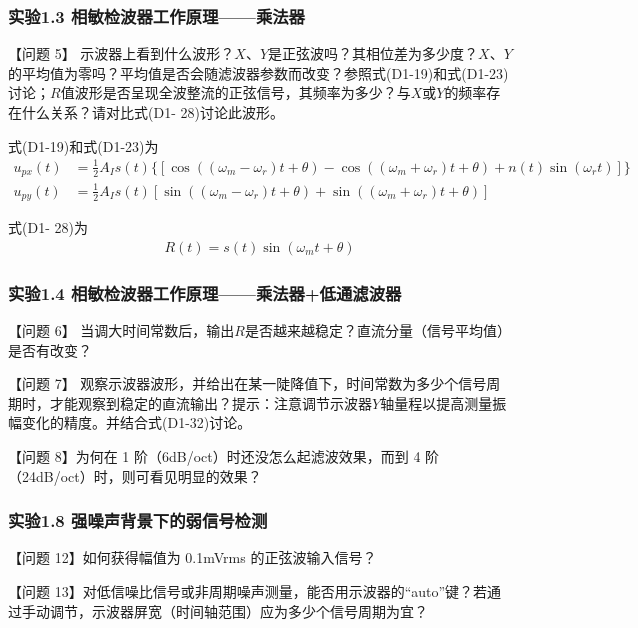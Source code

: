 \documentclass[dvipsnames, svgnames,a4paper,11pt]{article}
\begin{document}
	\subsubsection*{实验1.3 \quad 相敏检波器工作原理——乘法器}

		【问题 5】 示波器上看到什么波形？$X$、$Y$是正弦波吗？其相位差为多少度？$X$、$Y$的平均值为零吗？平均值是否会随滤波器参数而改变？参照式(D1-19)和式(D1-23)讨论；$R$值波形是否呈现全波整流的正弦信号，其频率为多少？与$X$或$Y$的频率存在什么关系？请对比式(D1- 28)讨论此波形。

		式(D1-19)和式(D1-23)为
		\begin{align*}
			u_{px}(t) &= \frac{1}{2} A_I s(t) \{ [ \cos((\omega_m - \omega_r)t + \theta) - \cos((\omega_m + \omega_r)t + \theta) + n(t)\sin(\omega_r t) ]\} \\
			u_{py}(t) &= \frac{1}{2} A_I s(t) [ \sin((\omega_m - \omega_r)t + \theta) + \sin((\omega_m + \omega_r)t + \theta) ]
		\end{align*}

		式(D1- 28)为
		\begin{align*}
			R(t) = s(t) \sin(\omega_m t + \theta)
		\end{align*}





		
	\subsubsection*{实验1.4 \quad 相敏检波器工作原理——乘法器+低通滤波器}

		【问题 6】 当调大时间常数后，输出$R$是否越来越稳定？直流分量（信号平均值）是否有改变？



		【问题 7】 观察示波器波形，并给出在某一陡降值下，时间常数为多少个信号周期时，才能观察到稳定的直流输出？提示：注意调节示波器$Y$轴量程以提高测量振幅变化的精度。并结合式(D1-32)讨论。



		【问题 8】为何在 1 阶（6dB/oct）时还没怎么起滤波效果，而到 4 阶（24dB/oct）时，则可看见明显的效果？

	\subsubsection*{实验1.8 \quad 强噪声背景下的弱信号检测}

		【问题 12】如何获得幅值为 0.1mVrms 的正弦波输入信号？


		【问题 13】对低信噪比信号或非周期噪声测量，能否用示波器的“auto”键？若通过手动调节，示波器屏宽（时间轴范围）应为多少个信号周期为宜？
\end{document}
